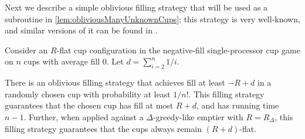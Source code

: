 Next we describe a simple oblivious filling strategy that will be used as a
subroutine in \cref{lem:obliviousManyUnknownCups}; this strategy is very
well-known, and similar versions of it can be found in
\cite{ mbe19, mbe15, die91, wku20}.
\begin{proposition}
  \label{prop:obliviousTerribleProbability}
  Consider an $R$-flat cup configuration in the negative-fill
  single-processor cup game on $n$ cups with average fill $0$.
  Let $d = \sum_{i=2}^n 1/i$.

  There is an oblivious filling strategy that achieves fill at
  least $-R + d$ in a randomly chosen cup with probability at
  least $1/n!$. This filling strategy guarantees that the chosen
  cup has fill at most $R + d$, and has running time $n-1$.
  Further, when applied against a $\Delta$-greedy-like emptier
  with $R = R_\Delta$, this filling strategy guarantees that
  the cups always remain $(R + d)$-flat.
\end{proposition}
